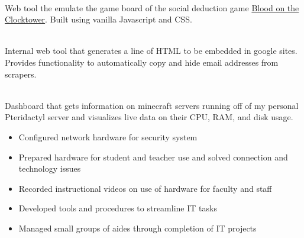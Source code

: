 \documentclass[10pt,a4paper,ragged2e,withhyper]{altacv}
\begin{document}

 \\\smallskip
Web tool the emulate the game board of the social deduction game \href{https://bloodontheclocktower.com/}{Blood on the Clocktower}. Built using vanilla Javascript and CSS.

\divider

\\\smallskip
Internal web tool that generates a line of HTML to be embedded in
google sites. Provides functionality to automatically copy and hide email
addresses from scrapers.

\divider

 \\\smallskip
Dashboard that gets information on minecraft servers running off
of my personal Pteridactyl server and visualizes live data on their
CPU, RAM, and disk usage.



\smallskip
{}

\begin{itemize}
\item Configured network hardware for security system
\item Prepared hardware for student and teacher use and solved connection and technology issues
\item Recorded instructional videos on use of hardware for faculty and staff
\item Developed tools and procedures to streamline IT tasks
\item Managed small groups of aides through completion of IT projects
\end{itemize}







\begin{paracol}{2}
\switchcolumn
{}
\end{paracol}








\end{document}
